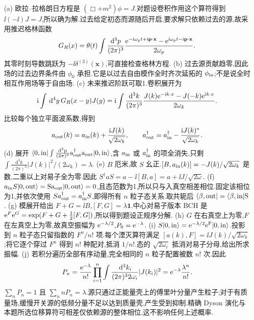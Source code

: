 \begin{solution}
(a) 欧拉--拉格朗日方程是 $(\Box+m^2)\phi=J$.对题设卷积作用这个算符得到 $\ii(-\ii)J=J$,所以确为解.过去给定初态而源随后开启,要求解只依赖过去的源,故采用推迟格林函数
\[
G_R(x)=\theta(t)\int\frac{\mathrm d^3p}{(2\pi)^3}\frac{\mathrm e^{-\mathrm i\omega_pt+\mathrm i\mathbf p\cdot\mathbf x}-\mathrm e^{\mathrm i\omega_pt-\mathrm i\mathbf p\cdot\mathbf x}}{2\omega_p}.
\]
其零时刻导数跳跃为 $-\ii\delta^{(3)}(\mathbf x)$,可直接检查格林方程.
(b) 过去源贡献趋零,因此场的过去边界条件由 $\phi_0$ 承担.它是以过去自由模作全时齐次延拓的 $\phi_{\rm in}$;不是说全时相互作用场等于自由场.
(c) 未来推迟阶跃可取1.卷积展开为
\[
\mathrm i\int\,\mathrm d^4y\,G_R(x-y)J(y)
=\mathrm i\int\frac{\mathrm d^3k}{(2\pi)^3}\frac{J(k)\mathrm e^{-\mathrm i k\cdot x}-J(-k)\mathrm e^{\mathrm i k\cdot x}}{2\omega_k}.
\]
比较每个独立平面波系数,得到
\[
a_{\rm out}(k)=a_{\rm in}(k)+\frac{\mathrm i J(k)}{\sqrt{2\omega_k}},\qquad
a_{\rm out}^\dagger=a_{\rm in}^\dagger-\frac{\mathrm i J(k)^*}{\sqrt{2\omega_k}}.
\]
(d) 展开 $\langle 0,\rm in\rvert\int\frac{\mathrm d^3p}{(2\pi)^3} a^\dagger_{\rm out}a_{\rm out}\lvert 0,\rm in\rangle$,含 $a_{\rm in}$ 或 $a_{\rm in}^\dagger$ 的项全消失,只剩 $\int\frac{\mathrm d^3k}{(2\pi)^3}|J(k)|^2/(2\omega_k)=\lambda$.
(e) $B$ 厄米,故 $S$ 幺正.$[B,a_{\rm in}(k)]=-J(k)/\sqrt{2\omega_k}$ 是数,二重以上对易子全为零.因此 $S^\dagger aS=a-\ii[B,a]=a+\ii J/\sqrt{2\omega}$.
(f) $a_{\rm in}S\lvert 0,\rm out\rangle=Sa_{\rm out}\lvert 0,\rm out\rangle=0$,且态范数为1,所以只与入真空相差相位.固定该相位为1,并依次使用 $Sa_{\rm out}^\dagger=a_{\rm in}^\dagger S$,即得所有 $n$ 粒子态关系.取共轭后 $\langle \beta,\rm out\rvert=\langle \beta,\rm in\rvert S$.
(g) 模展开给出 $F+G=\ii B$,$[F,G]=\lambda\mathbf1$.中心对易子版本 BCH 是 $\mathrm e^F\mathrm e^G=\exp(F+G+\tfrac12[F,G])$,所以得到题设正规序分解.
(h) $G$ 在右真空上为零,$F$ 在左真空上为零,故真空振幅为 $\mathrm e^{-\lambda/2}$,$P_0=\mathrm e^{-\lambda}$.
(i) $S\lvert 0,\rm in\rangle=\mathrm e^{-\lambda/2}\mathrm e^F\lvert 0,\rm in\rangle$.投影到 $n$ 粒子态只留指数的 $F^n/n!$ 项.每个湮灭算符满足 $[a(k),F]=\ii J(k)/\sqrt{2\omega_k}$;将它逐个穿过 $F^n$ 得到 $n!$ 种配对,抵消 $1/n!$.态的 $\sqrt{2\omega_i}$ 抵消对易子分母,给出所求振幅.
(j) 若积分遍历全部有序动量,完全相同的 $n$ 粒子配置被数 $n!$ 次.因此
\[
P_n=\frac{\mathrm e^{-\lambda}}{n!}\prod_{i=1}^n\int\frac{\,\mathrm d^3k_i}{(2\pi)^3 2\omega_i}|J(k_i)|^2
=\mathrm e^{-\lambda}\frac{\lambda^n}{n!}.
\]
$\sum_nP_n=1$ 且 $\sum_n nP_n=\lambda$.源只通过正能量壳上的傅里叶分量产生粒子;对于有质量场,缓慢开关源的低频分量不足以达到质量壳,产生受到抑制.精确 Dyson 演化与本题所选位移算符可相差仅依赖源的整体相位,这不影响任何上述概率.
\end{solution}
